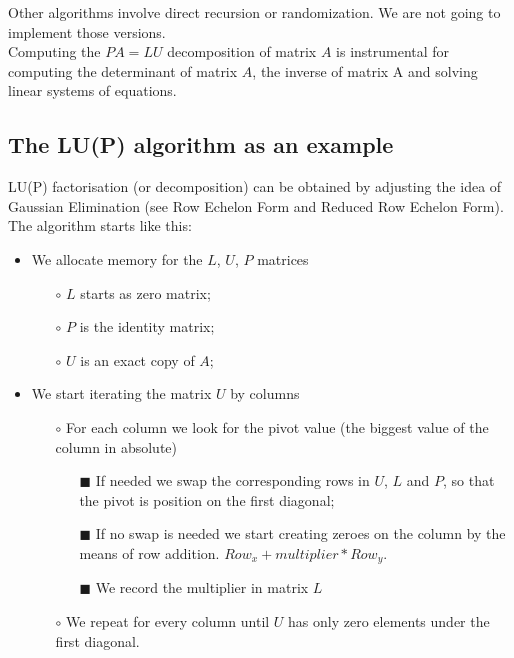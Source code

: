 Other algorithms involve direct recursion or randomization. We are not going to implement those versions.
\\

Computing the $PA=LU$ decomposition of matrix $A$ is instrumental for computing the determinant of matrix $A$, the inverse of matrix A and solving linear systems of equations.

\subsection{The LU(P) algorithm as an example}

LU(P) factorisation (or decomposition) can be obtained by adjusting the idea of Gaussian Elimination (see Row Echelon Form and Reduced Row Echelon Form).
\\

The algorithm starts like this:
\\

\begin{itemize}
\item We allocate memory for the $L$, $U$, $P$ matrices
	\begin{itemize} 
	\item[$\circ$] $L$ starts as zero matrix;
	\item[$\circ$] $P$ is the identity matrix;
	\item[$\circ$] $U$ is an exact copy of $A$;
	\end{itemize}
\item We start iterating the matrix $U$ by columns
	\begin{itemize} 
	\item[$\circ$] For each column we look for the pivot value (the biggest value of the column in absolute)
		\begin{itemize}
		\item[$\scriptstyle \blacksquare$] If needed we swap the corresponding rows in $U$, $L$ and $P$, so that the pivot is position on the first diagonal;
		\item[$\scriptstyle \blacksquare$] If no swap is needed we start creating zeroes on the column by the means of row addition. $Row_x + multiplier * Row_y$.
		\item[$\scriptstyle \blacksquare$] We record the multiplier in matrix $L$
		\end{itemize}
	\item[$\circ$] We repeat for every column until $U$ has only zero elements under the first diagonal.
	\end{itemize}
\end{itemize}

